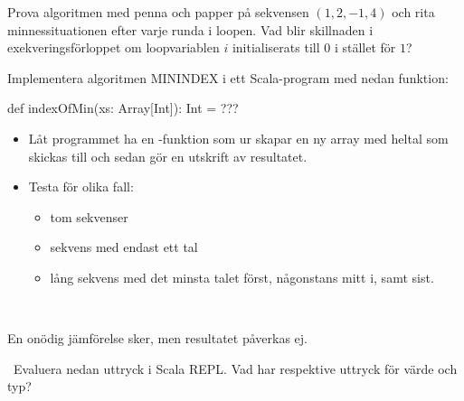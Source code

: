 \Subtask Prova algoritmen med penna och papper på sekvensen $(1, 2, -1, 4)$ och rita minnessituationen efter varje runda i loopen. Vad blir skillnaden i exekveringsförloppet om loopvariablen $i$  initialiserats till $0$ i stället för $1$?

\Subtask Implementera algoritmen MININDEX i ett Scala-program med nedan funktion:
\begin{Code}
def indexOfMin(xs: Array[Int]): Int = ???
\end{Code}
\begin{itemize}
  \item Låt programmet ha en -funktion som ur  skapar en ny array med heltal som skickas till  och sedan gör en utskrift av resultatet.
  \item Testa för olika fall:
  \begin{itemize}
    \item tom sekvenser
    \item sekvens med endast ett tal
    \item lång sekvens med det minsta talet först, någonstans mitt i, samt sist.
  \end{itemize}
\end{itemize}


\SOLUTION

\TaskSolved \what~

\SubtaskSolved En onödig jämförelse sker, men resultatet påverkas ej.

\SubtaskSolved



\QUESTEND






\QUESTBEGIN

\Task  \what~Evaluera nedan uttryck i Scala REPL. Vad har respektive uttryck för värde och typ?

\Subtask {}

\Subtask {}

\Subtask {}

\Subtask {}

\Subtask {}

\Subtask {}

\Subtask {}

